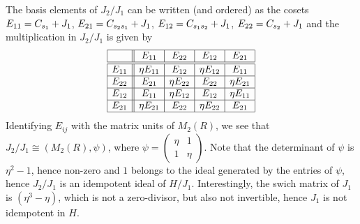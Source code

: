 \documentclass[oneside, a4paper, 11pt]{amsart}
\begin{document}
The basis elements of $J_2/J_1$ can be written (and ordered) as the cosets
$E_{11} = C_{s_1} + J_1$, $E_{21} = C_{s_2s_1} + J_1$, $E_{12} = C_{s_1s_2} + J_1$,
$E_{22}=C_{s_2} + J_1$ and the multiplication in $J_2/J_1$ is given by 
\[
\begin{array}{|c||c|c|c|c|}\hline
     &   E_{11}        & E_{22}          & E_{12}          & E_{21}                 \\\hline\hline
E_{11}  &  \eta E_{11}     & E_{12}         & \eta E_{12}      & E_{11}             \\\hline
E_{22}  &  E_{21}        & \eta E_{22}      & E_{22}   & \eta E_{21}               \\\hline
E_{12} &  E_{11} & \eta E_{12}     & E_{12}   & \eta E_{11}    \\\hline
E_{21} & \eta E_{21}     & E_{22} & \eta E_{22}  & E_{21}   \\\hline
\end{array}
\]
Identifying $E_{ij}$ with the matrix units of $M_2(R)$, we see that $J_2/J_1
\cong  (M_2(R),\psi)$, where
$\psi = \left(\begin{array}{cc}
                     \eta & 1 \\ 1 & \eta
              \end{array}\right)$. Note that the determinant of $\psi$
            is $\eta^2-1$, hence non-zero and $1$ belongs to the ideal
            generated by the entries of $\psi$, hence $J_2/J_1$ is an
            idempotent ideal of $H/J_1$.
Interestingly, the swich matrix of $J_1$ is $(\eta^3-\eta)$, which is 
not a zero-divisor, but also not invertible, hence $J_1$ is not idempotent in $H$.
\end{document}
